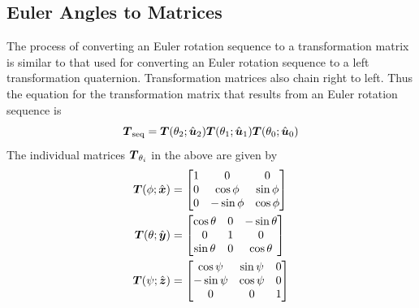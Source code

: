 \subsection{Euler Angles to Matrices}
The process of converting an Euler rotation sequence to a transformation matrix
is similar to that used for converting an Euler rotation sequence to a left
transformation quaternion. Transformation matrices also chain right to left.
Thus the equation for the transformation matrix that results from an Euler
rotation sequence is
\begin{equation}
  \label{eqn:euler_to_mat}
  \boldsymbol{T}_{\text{seq}} =
    \boldsymbol{T}(\theta_2;\hat{\boldsymbol{u}}_2)
    \boldsymbol{T}(\theta_1;\hat{\boldsymbol{u}}_1)
    \boldsymbol{T}(\theta_0;\hat{\boldsymbol{u}}_0)
\end{equation}
The individual matrices $\boldsymbol{T}_{\theta_i}$ in the above are given by
\begin{align}
  \label{eqn:mat_roll}
  \boldsymbol{T}(\phi; \hat{\boldsymbol{x}}) &=
  \begin{bmatrix}
     1 & 0 & 0 \\
     0 & \cos\phi & \sin\phi \\
     0 & -\sin\phi & \cos\phi
  \end{bmatrix} \\
  \label{eqn:mat_pitch}
  \boldsymbol{T}(\theta; \hat{\boldsymbol{y}}) &=
  \begin{bmatrix}
     \cos\theta & 0 & -\sin\theta \\
     0 & 1 & 0 \\
     \sin\theta & 0 & \cos\theta
  \end{bmatrix} \\
  \label{eqn:mat_yaw}
  \boldsymbol{T}(\psi; \hat{\boldsymbol{z}}) &=
  \begin{bmatrix}
     \cos\psi & \sin\psi & 0 \\
     -\sin\psi & \cos\psi & 0 \\
     0 & 0 & 1
  \end{bmatrix}
\end{align}

